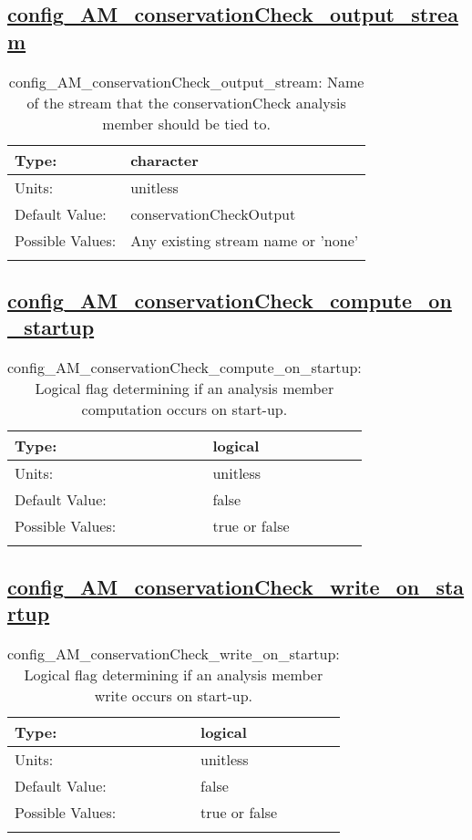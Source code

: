 \subsection[config\_AM\_conservationCheck\_output\_stream]{\hyperref[sec:nm_tab_AM_conservationCheck]{config\_AM\_conservationCheck\_output\_stream}}
\label{subsec:nm_sec_config_AM_conservationCheck_output_stream}
\begin{center}
\begin{longtable}{| p{2.0in} || p{4.0in} |}
    \hline
    Type: & character \\
    \hline
    Units: & \si{unitless} \\
    \hline
    Default Value: & conservationCheckOutput \\
    \hline
    Possible Values: & Any existing stream name or 'none' \\
    \hline
    \caption{config\_AM\_conservationCheck\_output\_stream: Name of the stream that the conservationCheck analysis member should be tied to.}
\end{longtable}
\end{center}
\subsection[config\_AM\_conservationCheck\_compute\_on\_startup]{\hyperref[sec:nm_tab_AM_conservationCheck]{config\_AM\_conservationCheck\_compute\_on\_startup}}
\label{subsec:nm_sec_config_AM_conservationCheck_compute_on_startup}
\begin{center}
\begin{longtable}{| p{2.0in} || p{4.0in} |}
    \hline
    Type: & logical \\
    \hline
    Units: & \si{unitless} \\
    \hline
    Default Value: & false \\
    \hline
    Possible Values: & true or false \\
    \hline
    \caption{config\_AM\_conservationCheck\_compute\_on\_startup: Logical flag determining if an analysis member computation occurs on start-up.}
\end{longtable}
\end{center}
\subsection[config\_AM\_conservationCheck\_write\_on\_startup]{\hyperref[sec:nm_tab_AM_conservationCheck]{config\_AM\_conservationCheck\_write\_on\_startup}}
\label{subsec:nm_sec_config_AM_conservationCheck_write_on_startup}
\begin{center}
\begin{longtable}{| p{2.0in} || p{4.0in} |}
    \hline
    Type: & logical \\
    \hline
    Units: & \si{unitless} \\
    \hline
    Default Value: & false \\
    \hline
    Possible Values: & true or false \\
    \hline
    \caption{config\_AM\_conservationCheck\_write\_on\_startup: Logical flag determining if an analysis member write occurs on start-up.}
\end{longtable}
\end{center}
